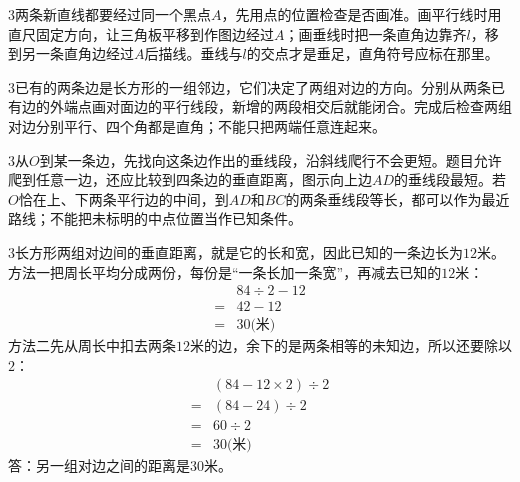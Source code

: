 \documentclass[multi=snippet,border={5bp 20bp 5bp 5bp}]{standalone}
\newenvironment{snippet}[3]{\begin{minipage}{#1bp}\color{answerred}\fontsize{#2}{#3}\selectfont\raggedright}{\end{minipage}}
\begin{document}
\begin{snippet}{505}{11.5}{14}\begin{multicols}{3}\raggedcolumns 两条新直线都要经过同一个黑点\(A\)\allowbreak ，先用点的位置检查是否画准。画平行线时用直尺固定方向，让三角板平移到作图边经过\(A\)\allowbreak ；画垂线时把一条直角边靠齐\(l\)\allowbreak ，移到另一条直角边经过\(A\)\allowbreak 后描线。垂线与\(l\)\allowbreak 的交点才是垂足，直角符号应标在那里。\end{multicols}\end{snippet}
\begin{snippet}{505}{11.5}{14}\begin{multicols}{3}\raggedcolumns 已有的两条边是长方形的一组邻边，它们决定了两组对边的方向。分别从两条已有边的外端点画对面边的平行线段，新增的两段相交后就能闭合。完成后检查两组对边分别平行、四个角都是直角；不能只把两端任意连起来。\end{multicols}\end{snippet}
\begin{snippet}{505}{11.5}{14}\begin{multicols}{3}\raggedcolumns 从\(O\)\allowbreak 到某一条边，先找向这条边作出的垂线段，沿斜线爬行不会更短。题目允许爬到任意一边，还应比较到四条边的垂直距离，图示向上边\(AD\)\allowbreak 的垂线段最短。若\(O\)\allowbreak 恰在上、下两条平行边的中间，到\(AD\)\allowbreak 和\(BC\)\allowbreak 的两条垂线段等长，都可以作为最近路线；不能把未标明的中点位置当作已知条件。\end{multicols}\end{snippet}
\begin{snippet}{505}{11.5}{14}\begin{multicols}{3}\raggedcolumns 长方形两组对边间的垂直距离，就是它的长和宽，因此已知的一条边长为\(12\)\allowbreak 米。方法一把周长平均分成两份，每份是“一条长加一条宽”，再减去已知的\(12\)\allowbreak 米：\[\begin{aligned}&84\div2-12\\={}&42-12\\={}&30\text{(米)}\end{aligned}\]方法二先从周长中扣去两条\(12\)\allowbreak 米的边，余下的是两条相等的未知边，所以还要除以\(2\)\allowbreak ：\[\begin{aligned}&(84-12\times2)\div2\\={}&(84-24)\div2\\={}&60\div2\\={}&30\text{(米)}\end{aligned}\]答：另一组对边之间的距离是30米。\end{multicols}\end{snippet}
\end{document}
